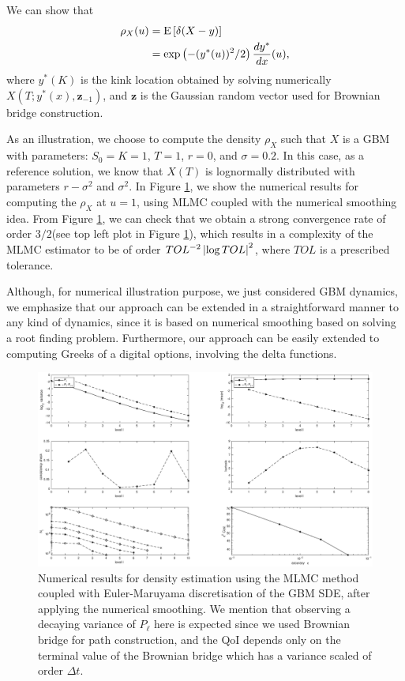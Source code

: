We can show that 
\begin{align}
\rho_{X}(u)&=\mathrm{E}\left[\delta(X-y)\right]\nonumber\\
&=\exp\left(-(y^\ast(u))^2/2\right) \frac{d y^\ast}{dx}(u),
\end{align}
where $y^\ast(K)$ is the kink location obtained by solving numerically $X(T; y^\ast(x), \mathbf{z}_{-1})$, and $\mathbf{z}$ is the Gaussian random  vector used for Brownian bridge construction.


As an illustration, we choose to compute the density $\rho_{X}$  such that $X$ is a GBM with parameters: $S_0=K=1$, $T=1$, $r=0$, and $\sigma=0.2$. In this case, as a reference solution,  we know that $X(T)$ is lognormally distributed with parameters $r-\sigma^2$ and $\sigma^2$. In Figure \ref{fig:euler_density_MLMC_with_smoothing}, we show the numerical results  for computing the $\rho_{X}$ at $u=1$, using  MLMC coupled with the numerical smoothing idea. From Figure \ref{fig:euler_density_MLMC_with_smoothing}, we can check that we obtain a strong convergence rate of order $3/2$(see  top left plot in Figure \ref{fig:euler_density_MLMC_with_smoothing}), which results in a complexity of the MLMC estimator to be of order $TOL^{-2} \left\lvert\log TOL\right\rvert^2$, where $TOL$ is a prescribed tolerance.

Although, for numerical illustration purpose, we just considered GBM dynamics, we emphasize that our approach can be extended in a straightforward manner to any kind of dynamics, since it is based on numerical smoothing based on solving a root finding problem. Furthermore, our approach can be easily extended to computing Greeks of a digital options, involving the delta functions.

\FloatBarrier
	\begin{figure}[h!]
\centering
\includegraphics[width=1.0\linewidth]{./figures/MLMC_density_estimation/density_L0_1_L_8.eps}

\caption{Numerical results for  density estimation  using the MLMC method coupled with Euler-Maruyama discretisation of the GBM SDE, after applying  the numerical smoothing. We mention that observing a decaying variance of $P_{\ell}$ here is expected since we used Brownian bridge for path construction, and the QoI depends only on the terminal value of the Brownian bridge which has a variance scaled of order $\Delta t$.}
\label{fig:euler_density_MLMC_with_smoothing}
\end{figure}

\FloatBarrier

